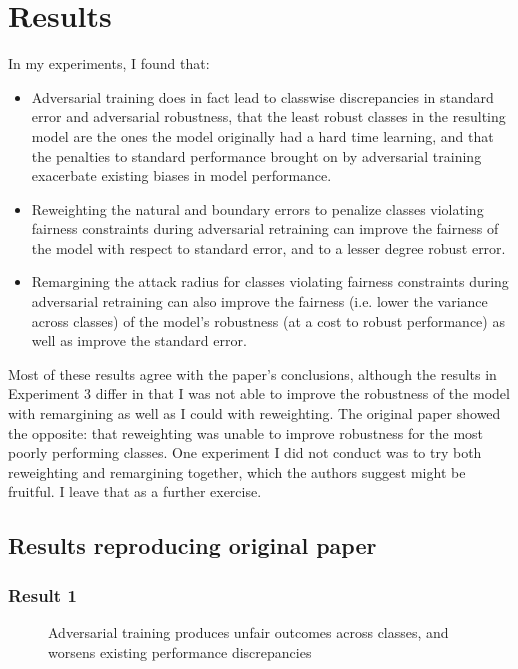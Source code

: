 \section{Results}
\label{sec:results}
In my experiments, I found that:
\begin{itemize}
    \item Adversarial training does in fact lead to classwise discrepancies in standard error and adversarial robustness, that the least robust classes in the resulting model are the ones the model originally had a hard time learning, and that the penalties to standard performance brought on by adversarial training exacerbate existing biases in model performance. 
    \item Reweighting the natural and boundary errors to penalize classes violating fairness constraints during adversarial retraining can improve the fairness of the model with respect to standard error, and to a lesser degree robust error.
    \item Remargining the attack radius for classes violating fairness constraints during adversarial retraining can also improve the fairness (i.e. lower the variance across classes) of the model's robustness (at a cost to robust performance) as well as improve the standard error.
\end{itemize}

Most of these results agree with the paper's conclusions, although the results in Experiment 3 differ in that I was not able to improve the robustness of the model with remargining as well as I could with reweighting. The original paper showed the opposite: that reweighting was unable to improve robustness for the most poorly performing classes. One experiment I did not conduct was to try both reweighting and remargining together, which the authors suggest might be fruitful. I leave that as a further exercise.  

\subsection{Results reproducing original paper}

\subsubsection{Result 1}

\begin{figure}%
    \centering
    \qquad
    \caption{Adversarial training produces unfair outcomes across classes, and worsens existing performance discrepancies}%
    \label{fig:example}%
\end{figure}

